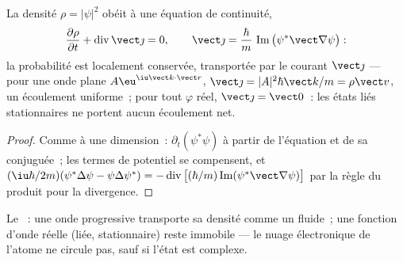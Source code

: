 \begin{proposition}\label{prop:b3:schrodinger-three-dimensions:current}
La densité $\rho = |\psi|^2$ obéit à une équation de continuité,
\[
\frac{\partial\rho}{\partial t} + \operatorname{div}\vect\jmath = 0 ,
\qquad
\vect\jmath = \frac{\hbar}{m}\,
\operatorname{Im}\big(\psi^*\vect\nabla\psi\big) :
\]
la probabilité est localement conservée, transportée par le courant
$\vect\jmath$ --- pour une onde plane $A\eu^{\iu\vect k\cdot\vect r}$,
$\vect\jmath = |A|^2\hbar\vect k/m = \rho\vect v$, un écoulement
uniforme~; pour tout $\varphi$ réel, $\vect\jmath = \vect 0$~: les
états liés stationnaires ne portent aucun écoulement net.
\end{proposition}

\begin{proof}
Comme à une dimension~: $\partial_t(\psi^*\psi)$ à partir de l'équation
et de sa conjuguée~; les termes de potentiel se compensent, et $(\iu\hbar/2m)
(\psi^*\Delta\psi - \psi\Delta\psi^*) =
-\operatorname{div}\big[(\hbar/m)\operatorname{Im}(\psi^*\vect\nabla
\psi)\big]$ par la règle du produit pour la divergence.
\end{proof}

\begin{omfigure}

{\small Le ~: une onde progressive transporte sa
densité comme un fluide~; une fonction d'onde réelle (liée,
stationnaire) reste immobile --- le nuage électronique de l'atome ne
circule pas, sauf si l'état est complexe.}
\end{omfigure}

